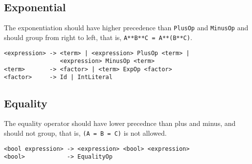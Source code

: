 \documentclass[11pt]{article}
\begin{document}
\subsection{Exponential}
\label{sec-2-1}
The exponentiation should have higher precedence than \texttt{PlusOp} and 
\texttt{MinusOp} and should group from right to left, that is, 
\texttt{A**B**C = A**(B**C)}.
\begin{verbatim}
<expression> -> <term> | <expression> PlusOp <term> | 
                <expression> MinusOp <term>
<term>       -> <factor> | <term> ExpOp <factor>
<factor>     -> Id | IntLiteral
\end{verbatim}

\subsection{Equality}
\label{sec-2-2}
The equality operator should have lower precednce than plus and minus,
and should not group, that is, \texttt{(A = B = C)} is not allowed.
\begin{verbatim}
<bool expression> -> <expression> <bool> <expression>
<bool>            -> EqualityOp
\end{verbatim}
\end{document}
